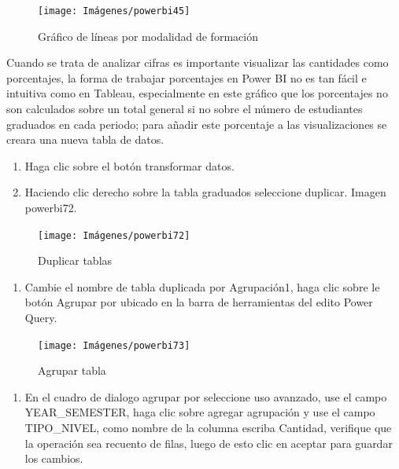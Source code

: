 \documentclass[
]{book}
\providecommand{\tightlist}{%
  \setlength{\itemsep}{0pt}\setlength{\parskip}{0pt}}
\begin{document}
\begin{figure}

{\centering \texttt{[image: Imágenes/powerbi45]} 

}

\caption{Gráfico de líneas por modalidad de formación}\label{fig:paso7lineassegmentadobi-fig}
\end{figure}

Cuando se trata de analizar cifras es importante visualizar las cantidades como porcentajes, la forma de trabajar porcentajes en Power BI no es tan fácil e intuitiva como en Tableau, especialmente en este gráfico que los porcentajes no son calculados sobre un total general si no sobre el número de estudiantes graduados en cada periodo; para añadir este porcentaje a las visualizaciones se creara una nueva tabla de datos.

\begin{enumerate}
\def\labelenumi{\arabic{enumi}.}
\item
  Haga clic sobre el botón transformar datos.
\item
  Haciendo clic derecho sobre la tabla graduados seleccione duplicar. Imagen powerbi72.
\end{enumerate}

\begin{figure}

{\centering \texttt{[image: Imágenes/powerbi72]} 

}

\caption{Duplicar tablas}\label{fig:paso2porcentajes-fig}
\end{figure}

\begin{enumerate}
\def\labelenumi{\arabic{enumi}.}
\setcounter{enumi}{2}
\tightlist
\item
  Cambie el nombre de tabla duplicada por Agrupación1, haga clic sobre le botón Agrupar por ubicado en la barra de herramientas del edito Power Query.
\end{enumerate}

\begin{figure}

{\centering \texttt{[image: Imágenes/powerbi73]} 

}

\caption{Agrupar tabla}\label{fig:paso3porcentajes-fig}
\end{figure}

\begin{enumerate}
\def\labelenumi{\arabic{enumi}.}
\setcounter{enumi}{3}
\tightlist
\item
  En el cuadro de dialogo agrupar por seleccione uso avanzado, use el campo YEAR\_SEMESTER, haga clic sobre agregar agrupación y use el campo TIPO\_NIVEL, como nombre de la columna escriba Cantidad, verifique que la operación sea recuento de filas, luego de esto clic en aceptar para guardar los cambios.
\end{enumerate}
\end{document}
